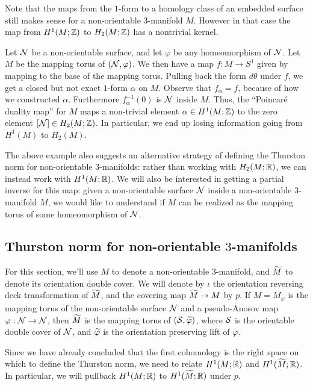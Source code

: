 Note that the maps from the $1$-form to a homology class of an embedded surface still makes sense for a non-orientable $3$-manifold $M$. However in that case the map from $H^1(M; \mathbb{Z})$ to $H_2(M; \mathbb{Z})$ has a nontrivial kernel.

  Let $\mathcal{N}$ be a non-orientable surface, and let $\varphi$ be any homeomorphism of $\mathcal{N}$. Let $M$ be the mapping torus
  of $(\mathcal{N}, \varphi)$. We then have a map $f: M \to S^1$ given by mapping to the base of the mapping torus.
  Pulling back the form $d\theta$ under $f$, we get a closed but not exact $1$-form $\alpha$ on $M$. Observe
  that $f_{\alpha} = f$, because of how we constructed $\alpha$. Furthermore $f_{\alpha}^{-1}(0)$ is $\mathcal{N}$ inside
  $M$. Thus, the ``Poincar\'e duality map'' for $M$ maps a non-trivial element $\alpha \in H^1(M; \mathbb{Z})$ to the
  zero element $[\mathcal{N}] \in H_2(M; \mathbb{Z})$. In particular, we end up losing information
  going from $H^1(M)$ to $H_2(M)$.


The above example also suggests an alternative strategy of defining the Thurston norm for non-orientable
$3$-manifolds: rather than working with $H_2(M; \mathbb{R})$, we can instead work with $H^1(M; \mathbb{R})$. We will also be interested in getting a partial
inverse for this map: given a non-orientable surface $\mathcal{N}$ inside a non-orientable
$3$-manifold $M$, we would like to understand if $M$ can be realized as the mapping torus of some homeomorphism of
$\mathcal{N}$.

\subsection{Thurston norm for non-orientable $3$-manifolds}
\label{sec:thurston-norm-non}

For this section, we'll use $M$ to denote a non-orientable $3$-manifold, and $\widetilde{M}$ to denote its
orientation double cover. We will denote by $\iota$ the orientation reversing deck transformation
of $\widetilde{M}$, and the covering map $\widetilde{M} \to M$ by $p$. If $M=M_\varphi$ is the mapping torus of the
non-orientable surface $\mathcal{N}$ and a pseudo-Anosov map $\varphi: \mathcal{N} \to \mathcal{N}$, then $\widetilde{M}$ is the
mapping torus of $(\mathcal{S}, \widetilde{\varphi})$, where $\mathcal{S}$ is the orientable double cover of $\mathcal{N}$, and
$\widetilde{\varphi}$ is the orientation preserving lift of $\varphi$.

Since we have already concluded that the first cohomology is the right space on which to define the
Thurston norm, we need to relate $H^1(M; \mathbb{R})$ and $H^1(\widetilde{M}; \mathbb{R})$.  In particular, we will pullback $H^1(M;\mathbb{R})$ to $H^1(\widetilde{M};\mathbb{R})$ under $p$.

